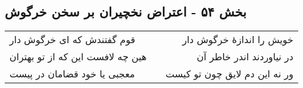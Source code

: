 \begin{center}
\section*{بخش ۵۴ - اعتراض نخچیران بر سخن خرگوش}
\label{sec:sh054}
\begin{longtable}{l p{0.5cm} r}
قوم گفتندش که ای خرگوش دار
&&
خویش را اندازهٔ خرگوش دار
\\
هین چه لافست این که از تو بهتران
&&
در نیاوردند اندر خاطر آن
\\
معجبی یا خود قضامان در پیست
&&
ور نه این دم لایق چون تو کیست
\\
\end{longtable}
\end{center}
